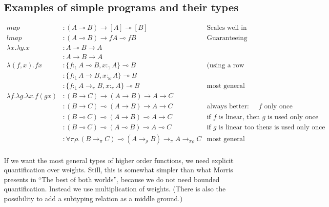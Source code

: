 \documentclass[11pt]{article}
\begin{document}
\subsection{Examples of simple programs and their types}

\hspace{-4cm}\begin{minipage}{\textwidth}
\begin{align*}
map & : (A ⊸ B) → [A] ⊸ [B] & \text{Scales well in unrestricted contexts}\\
lmap & : (A ⊸ B) → f A ⊸ f B & \text{Guaranteeing that no element is lost} \\
λx. λy. x & : A ⊸ B → A \\
          & : A → B → A \\
λ(f,x). f x & : \{f :_1 A ⊸ B, x :_1 A\} ⊸ B & \text{(using a row type for concision)}\\
            & : \{f :_1 A → B, x :_ω A\} ⊸ B \\
            & : \{f :_1 A →_π B, x :_π A\} ⊸ B & \text{most general type} \\
λf. λg. λx. f (g x) & : (B → C) → (A → B) → A → C \\
                    & : (B → C) ⊸ (A → B) → A → C & \text {always better: comp uses $f$  only once} \\
                    & : (B ⊸ C) ⊸ (A → B) ⊸ A → C & \text {if $f$ is linear, then $g$ is used only once} \\
                    & : (B ⊸ C) ⊸ (A ⊸ B) ⊸ A ⊸ C & \text {if $g$ is linear too then $x$ is used only once} \\
                    & : ∀ π ρ. (B →_π C) ⊸ (A →_ρ B) →_π A →_{πρ} C & \text{most general type} \\
\end{align*}
\end{minipage}


If we want the most general types of higher order functions, we need
explicit quantification over weights. Still, this is somewhat simpler
than what Morris presents in ``The best of both worlds'', because we
do not need bounded quantification. Instead we use multiplication of
weights. (There is also the possibility to add a subtyping relation as
a middle ground.)

\end{document}
